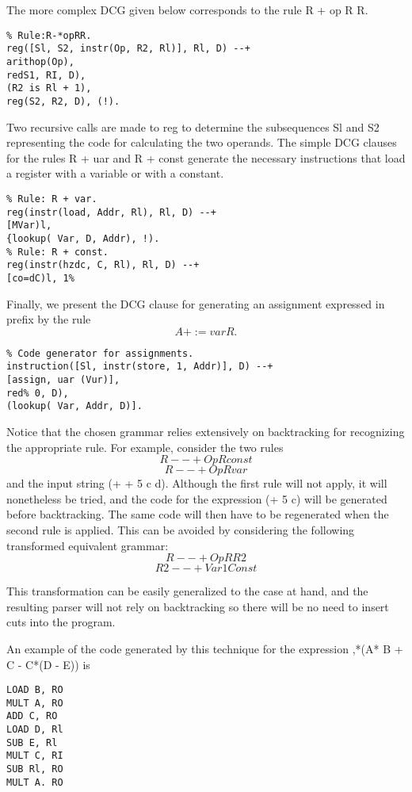 The more complex DCG given below corresponds to the rule R + op R R.
\begin{verbatim}
% Rule:R-*opRR.
reg([Sl, S2, instr(Op, R2, Rl)], Rl, D) --+
arithop(Op),
redS1, RI, D),
(R2 is Rl + 1),
reg(S2, R2, D), (!). 
\end{verbatim}

Two recursive calls are made to reg to determine the subsequences Sl and S2
representing the code for calculating the two operands. The simple DCG clauses
for the rules R + uar and R + const generate the necessary instructions that
load a register with a variable or with a constant.
\begin{verbatim}
% Rule: R + var.
reg(instr(load, Addr, Rl), Rl, D) --+
[MVar)l,
{lookup( Var, D, Addr), !).
% Rule: R + const.
reg(instr(hzdc, C, Rl), Rl, D) --+
[co=dC)l, 1% 
\end{verbatim}

Finally, we present the DCG clause for generating an assignment expressed in
prefix by the rule
\[A + := var R.\]
\begin{verbatim}
% Code generator for assignments.
instruction([Sl, instr(store, 1, Addr)], D) --+
[assign, uar (Vur)],
red% 0, D),
(lookup( Var, Addr, D)]. 
\end{verbatim}

Notice that the chosen grammar relies extensively on backtracking for recognizing
the appropriate rule. For example, consider the two rules
\[R --+ Op R const\]
\[R --+ Op R var\]
and the input string (+ + 5 c d). Although the first rule will not apply, it will
nonetheless be tried, and the code for the expression (+ 5 c) will be generated
before backtracking. The same code will then have to be regenerated when the
second rule is applied. This can be avoided by considering the following transformed
equivalent grammar:
\[R --+ Op R R2\]
\[R2 --+ Var 1 Const\]

This transformation can be easily generalized to the case at hand, and the
resulting parser will not rely on backtracking so there will be no need to insert
cuts into the program. 

An example of the code generated by this technique for the expression
,*(A* B + C - C*(D - E)) is
\begin{verbatim}
LOAD B, RO
MULT A, RO
ADD C, RO
LOAD D, Rl
SUB E, Rl
MULT C, RI
SUB Rl, RO
MULT A. RO  
\end{verbatim}
